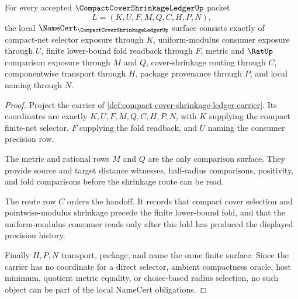 \begin{theorem}
\label{thm:compact-cover-shrinkage-ledger-namecert-obligations}
For every accepted $\CompactCoverShrinkageLedgerUp$ packet
$$
L=(K,U,F,M,Q,C,H,P,N),
$$
the local $\NameCert_{\CompactCoverShrinkageLedgerUp}$ surface consists exactly of compact-net selector exposure through $K$, uniform-modulus consumer exposure through $U$, finite lower-bound fold readback through $F$, metric and $\RatUp$ comparison exposure through $M$ and $Q$, cover-shrinkage routing through $C$, componentwise transport through $H$, package provenance through $P$, and local naming through $N$.
\end{theorem}
\begin{proof}
Project the carrier of \autoref{def:compact-cover-shrinkage-ledger-carrier}. Its coordinates are exactly $K,U,F,M,Q,C,H,P,N$, with $K$ supplying the compact finite-net selector, $F$ supplying the fold readback, and $U$ naming the consumer precision row.

The metric and rational rows $M$ and $Q$ are the only comparison surface. They provide source and target distance witnesses, half-radius comparisons, positivity, and fold comparisons before the shrinkage route can be read.

The route row $C$ orders the handoff. It records that compact cover selection and pointwise-modulus shrinkage precede the finite lower-bound fold, and that the uniform-modulus consumer reads only after this fold has produced the displayed precision history.

Finally $H,P,N$ transport, package, and name the same finite surface. Since the carrier has no coordinate for a direct selector, ambient compactness oracle, host minimum, quotient metric equality, or choice-based radius selection, no such object can be part of the local NameCert obligations.
\end{proof}

